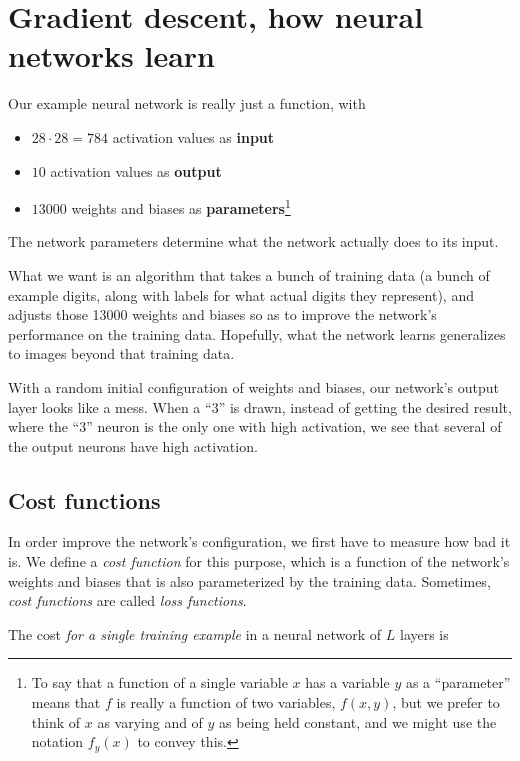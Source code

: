 \documentclass{article}
\begin{document}
	\section*{Gradient descent, how neural networks learn}
	
	Our example neural network is really just a function, with
	
	\begin{itemize}
		\item $28 \cdot 28 = 784$ activation values as \textbf{input}
		\item $10$ activation values as \textbf{output}
		\item $13000$ weights and biases as \textbf{parameters}\footnote{To say that a function of a single variable $x$ has a variable $y$ as a ``parameter'' means that $f$ is really a function of two variables, $f(x, y)$, but we prefer to think of $x$ as varying and of $y$ as being held constant, and we might use the notation $f_y(x)$ to convey this.}
	\end{itemize}
	
	The network parameters determine what the network actually does to its input.
	
	What we want is an algorithm that takes a bunch of training data (a bunch of example digits, along with labels for what actual digits they represent), and adjusts those 13000 weights and biases so as to improve the network's performance on the training data. Hopefully, what the network learns generalizes to images beyond that training data.
	
	With a random initial configuration of weights and biases, our network's output layer looks like a mess. When a ``$3$'' is drawn, instead of getting the desired result, where the ``$3$'' neuron is the only one with high activation, we see that several of the output neurons have high activation.
	
	\subsection*{Cost functions}
	
	In order improve the network's configuration, we first have to measure how bad it is. We define a \textit{cost function} for this purpose, which is a function of the network's weights and biases that is also parameterized by the training data. Sometimes, \textit{cost functions} are called \textit{loss functions}.
	
	The cost \textit{for a single training example} in a neural network of $L$ layers is 
	
\end{document}

